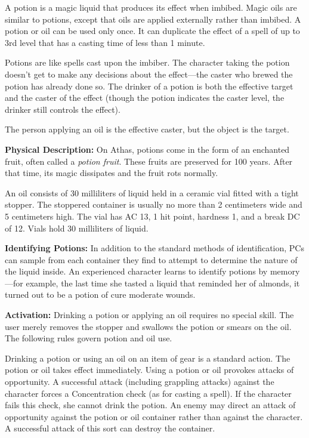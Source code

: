 A potion is a magic liquid that produces its effect when imbibed. Magic oils are similar to potions, except that oils are applied externally rather than imbibed. A potion or oil can be used only once. It can duplicate the effect of a spell of up to 3rd level that has a casting time of less than 1 minute.

Potions are like spells cast upon the imbiber. The character taking the potion doesn't get to make any decisions about the effect---the caster who brewed the potion has already done so. The drinker of a potion is both the effective target and the caster of the effect (though the potion indicates the caster level, the drinker still controls the effect).

The person applying an oil is the effective caster, but the object is the target.

\textbf{Physical Description:} On Athas, potions come in the form of an enchanted fruit, often called a \emph{potion fruit}. These fruits are preserved for 100 years. After that time, its magic dissipates and the fruit rots normally.

An oil consists of 30 milliliters of liquid held in a ceramic vial fitted with a tight stopper. The stoppered container is usually no more than 2 centimeters wide and 5 centimeters high. The vial has AC 13, 1 hit point, hardness 1, and a break DC of 12. Vials hold 30 milliliters of liquid.

\textbf{Identifying Potions:} In addition to the standard methods of identification, PCs can sample from each container they find to attempt to determine the nature of the liquid inside. An experienced character learns to identify potions by memory---for example, the last time she tasted a liquid that reminded her of almonds, it turned out to be a potion of cure moderate wounds.

\textbf{Activation:} Drinking a potion or applying an oil requires no special skill. The user merely removes the stopper and swallows the potion or smears on the oil. The following rules govern potion and oil use.

Drinking a potion or using an oil on an item of gear is a standard action. The potion or oil takes effect immediately. Using a potion or oil provokes attacks of opportunity. A successful attack (including grappling attacks) against the character forces a Concentration check (as for casting a spell). If the character fails this check, she cannot drink the potion. An enemy may direct an attack of opportunity against the potion or oil container rather than against the character. A successful attack of this sort can destroy the container.

